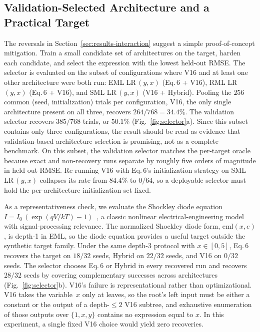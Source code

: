 \subsection{Validation-Selected Architecture and a Practical Target}
\label{sec:results-selection}

The reversals in Section~\ref{sec:results-interaction} suggest
a simple proof-of-concept mitigation.  Train a small candidate
set of architectures on the target, harden each candidate, and
select the expression with the lowest held-out RMSE.  The selector is evaluated on the subset of configurations where
V16 and at least one other architecture were both run: EML
LR\,$(y,x)$ (Eq.\,6 + V16), RML LR\,$(y,x)$ (Eq.\,6 + V16), and
SML LR\,$(y,x)$ (V16 + Hybrid).  Pooling
the $256$ common (seed, initialization) trials per
configuration, V16, the only single architecture present
on all three, recovers $264/768 = 34.4\%$.  The validation
selector recovers $385/768$ trials, or $50.1\%$
(Fig.~\ref{fig:selector}a).  Since this subset contains only
three configurations, the result should be read as evidence that
validation-based architecture selection is promising, not as a
complete benchmark.  On this subset, the validation selector
matches the per-target oracle because exact and non-recovery
runs separate by roughly five orders of magnitude in held-out
RMSE.  Re-running V16 with
Eq.\,6's initialization strategy on SML LR\,$(y,x)$ collapses
its rate from $84.4\%$ to $0/64$, so a deployable selector must
hold the per-architecture initialization set fixed.

As a representativeness check, we evaluate the Shockley diode
equation $I = I_0\,(\exp(qV/kT) - 1)$~\citep{Shockley1949pn},
a classic nonlinear electrical-engineering model with
signal-processing relevance.  The normalized Shockley diode
form, $\mathrm{eml}(x,e)$, is depth-1 in EML, so the diode
equation provides a useful target outside the synthetic target
family.
Under the same depth-3 protocol with $x \in [0, 5]$, Eq.\,6
recovers the target on $18/32$ seeds, Hybrid on $22/32$ seeds,
and V16 on $0/32$ seeds.  The selector chooses Eq.\,6 or Hybrid
in every recovered run and recovers $28/32$ seeds by covering
complementary successes across architectures
(Fig.~\ref{fig:selector}b).  V16's failure is representational
rather than optimizational.  V16 takes the variable~$x$ only at
leaves, so the root's left input must be either a constant or
the output of a depth-$\le 2$ V16 subtree, and exhaustive
enumeration of those outputs over $\{1, x, y\}$ contains no
expression equal to $x$.  In this experiment, a single fixed
V16 choice would yield zero recoveries.
